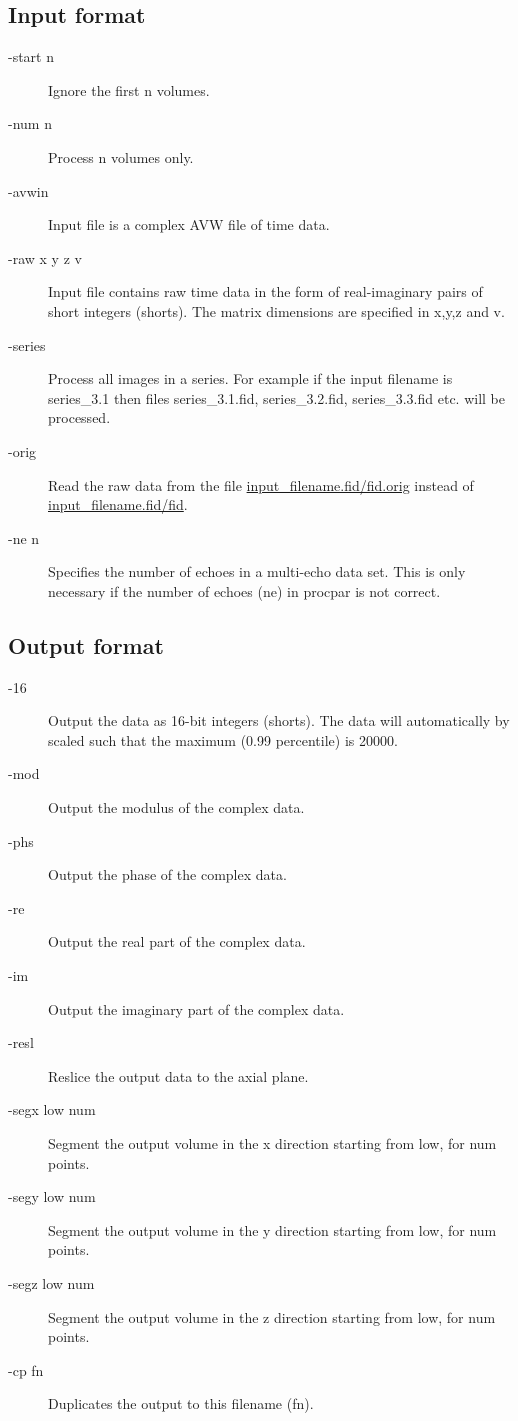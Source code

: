 \documentclass[12pt, a4paper]{article}
\begin{document}
\subsection*{Input format}
\begin{description}
\item[-start n] Ignore the first n volumes.
\item[-num n] Process n volumes only.
\item[-avwin] Input file is a complex AVW file of time data.
\item[-raw x y z v] Input file contains raw time data in the form of
  real-imaginary pairs of short integers (shorts).  The matrix
  dimensions are specified in x,y,z and v.
\item[-series] Process all images in a series.  For example if the
  input filename is \mbox{series\_3.1} then files
  \mbox{series\_3.1.fid}, \mbox{series\_3.2.fid},
  \mbox{series\_3.3.fid} etc. will be processed.
\item[-orig] Read the raw data from the file
  \url{input_filename.fid/fid.orig} instead of
  \url{input_filename.fid/fid}.
\item[-ne n] Specifies the number of echoes in a multi-echo data set.
  This is only necessary if the number of echoes (ne) in procpar is
  not correct.
\end{description}

\subsection*{Output format}
\begin{description}
\item[-16] Output the data as 16-bit integers (shorts).  The data will
  automatically by scaled such that the maximum (0.99 percentile) is
  20000.
\item[-mod] Output the modulus of the complex data.
\item[-phs] Output the phase of the complex data.
\item[-re] Output the real part of the complex data.
\item[-im] Output the imaginary part of the complex data.
\item[-resl] Reslice the output data to the axial plane.
\item[-segx low num] Segment the output volume in the x direction
  starting from low, for num points.
\item[-segy low num] Segment the output volume in the y direction
  starting from low, for num points.
\item[-segz low num] Segment the output volume in the z direction
  starting from low, for num points.
\item[-cp fn] Duplicates the output to this filename (fn).
\end{description}
\end{document}
